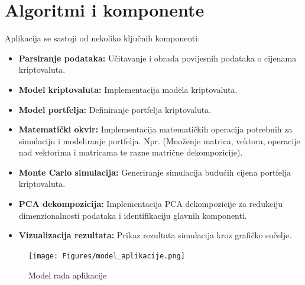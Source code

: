 \documentclass[zavrsnirad]{fer}
\begin{document}
\section{Algoritmi i komponente}
\label{sek:algoritmi_i_komponente}
Aplikacija se sastoji od nekoliko ključnih komponenti:
\begin{itemize}
    \item \textbf{Parsiranje podataka:} Učitavanje i obrada povijesnih
    podataka o cijenama kriptovaluta.

    \item \textbf{Model kriptovaluta:} Implementacija modela kriptovaluta.

    \item \textbf{Model portfelja:} Definiranje portfelja kriptovaluta.

    \item \textbf{Matematički okvir:} Implementacija matematičkih
    operacija potrebnih za simulaciju i modeliranje portfelja. Npr.
        (Množenje matrica, vektora, operacije nad vektorima i matricama te
        razne matrične dekompozicije).

    \item \textbf{Monte Carlo simulacija:} Generiranje simulacija
    budućih cijena portfelja kriptovaluta.

    \item \textbf{PCA dekompozicija:} Implementacija PCA dekompozicije
    za redukciju dimenzionalnosti podataka i identifikaciju glavnih
    komponenti.

    \item \textbf{Vizualizacija rezultata:} Prikaz rezultata simulacija
    kroz grafičko sučelje.
\end{itemize}

\begin{figure}[ht]
    \centering
    \texttt{[image: Figures/model\_aplikacije.png]}
    \caption{Model rada aplikacije}
    \label{fig:model_aplikacije}
\end{figure}
\end{document}

